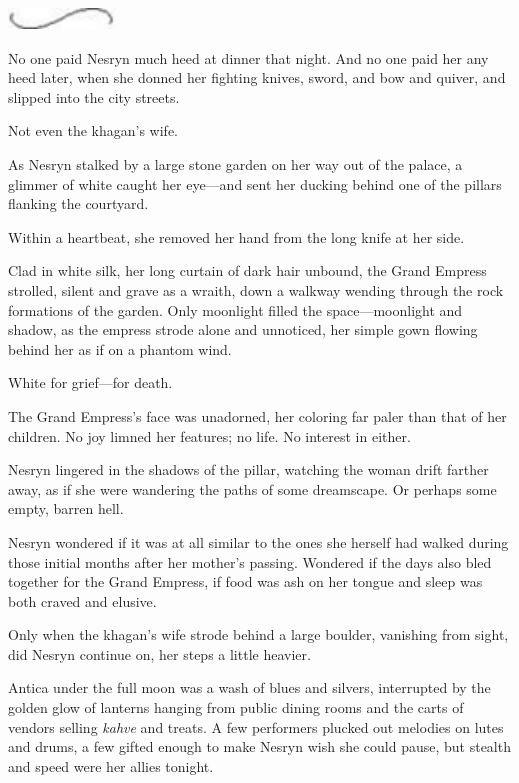\begin{center}
	\includegraphics[width=1.12in,height=0.24in]{images/seperator}
\end{center}

No one paid Nesryn much heed at dinner that night.
And no one paid her any heed later, when she donned her fighting knives, sword, and bow and quiver, and slipped into the city streets.

Not even the khagan's wife.

As Nesryn stalked by a large stone garden on her way out of the palace, a glimmer of white caught her eye---and sent her ducking behind one of the pillars flanking the courtyard.

Within a heartbeat, she removed her hand from the long knife at her side.

Clad in white silk, her long curtain of dark hair unbound, the Grand Empress strolled, silent and grave as a wraith, down a walkway wending through the rock formations of the garden.
Only moonlight filled the space---moonlight and shadow, as the empress strode alone and unnoticed, her simple gown flowing behind her as if on a phantom wind.

White for grief---for death.

The Grand Empress's face was unadorned, her coloring far paler than that of her children.
No joy limned her features; no life.
No interest in either.

Nesryn lingered in the shadows of the pillar, watching the woman drift farther away, as if she were wandering the paths of some dreamscape.
Or perhaps some empty, barren hell.

Nesryn wondered if it was at all similar to the ones she herself had walked during those initial months after her mother's passing.
Wondered if the days also bled together for the Grand Empress, if food was ash on her tongue and sleep was both craved and elusive.

Only when the khagan's wife strode behind a large boulder, vanishing from sight, did Nesryn continue on, her steps a little heavier.

Antica under the full moon was a wash of blues and silvers, interrupted by the golden glow of lanterns hanging from public dining rooms and the carts of vendors selling \emph{kahve} and treats.
A few performers plucked out melodies on lutes and drums, a few gifted enough to make Nesryn wish she could pause, but stealth and speed were her allies tonight.

